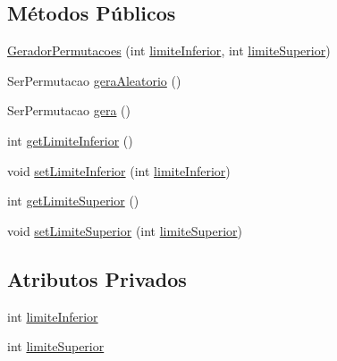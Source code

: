 \subsection*{Métodos Públicos}
\begin{DoxyCompactItemize}
\item 
\hyperlink{classic_1_1populacional_1_1seres_1_1permutacoes_1_1_gerador_permutacoes_a2b9aedbd540c20e9ef4abbec2a80e383}{Gerador\-Permutacoes} (int \hyperlink{classic_1_1populacional_1_1seres_1_1permutacoes_1_1_gerador_permutacoes_a1e57711cdca6ca1ae36f4ded9ca89cc8}{limite\-Inferior}, int \hyperlink{classic_1_1populacional_1_1seres_1_1permutacoes_1_1_gerador_permutacoes_af140d7298a0bb2b8fc5297474228122f}{limite\-Superior})
\item 
Ser\-Permutacao \hyperlink{classic_1_1populacional_1_1seres_1_1permutacoes_1_1_gerador_permutacoes_ab44a312d6089675ab1a89bb7619739aa}{gera\-Aleatorio} ()
\item 
Ser\-Permutacao \hyperlink{classic_1_1populacional_1_1seres_1_1permutacoes_1_1_gerador_permutacoes_a49bc0197f542704a818284c2d286e6d9}{gera} ()
\item 
int \hyperlink{classic_1_1populacional_1_1seres_1_1permutacoes_1_1_gerador_permutacoes_a1ab108c463da60f9925bed5367b03de4}{get\-Limite\-Inferior} ()
\item 
void \hyperlink{classic_1_1populacional_1_1seres_1_1permutacoes_1_1_gerador_permutacoes_aa5b4716c1212fb1fb5e48536a618407f}{set\-Limite\-Inferior} (int \hyperlink{classic_1_1populacional_1_1seres_1_1permutacoes_1_1_gerador_permutacoes_a1e57711cdca6ca1ae36f4ded9ca89cc8}{limite\-Inferior})
\item 
int \hyperlink{classic_1_1populacional_1_1seres_1_1permutacoes_1_1_gerador_permutacoes_a0fdb3341ed4cfee7449d1d0287715a78}{get\-Limite\-Superior} ()
\item 
void \hyperlink{classic_1_1populacional_1_1seres_1_1permutacoes_1_1_gerador_permutacoes_aa6fe8cf54287162db359df8d12818ae5}{set\-Limite\-Superior} (int \hyperlink{classic_1_1populacional_1_1seres_1_1permutacoes_1_1_gerador_permutacoes_af140d7298a0bb2b8fc5297474228122f}{limite\-Superior})
\end{DoxyCompactItemize}
\subsection*{Atributos Privados}
\begin{DoxyCompactItemize}
\item 
int \hyperlink{classic_1_1populacional_1_1seres_1_1permutacoes_1_1_gerador_permutacoes_a1e57711cdca6ca1ae36f4ded9ca89cc8}{limite\-Inferior}
\item 
int \hyperlink{classic_1_1populacional_1_1seres_1_1permutacoes_1_1_gerador_permutacoes_af140d7298a0bb2b8fc5297474228122f}{limite\-Superior}
\end{DoxyCompactItemize}


